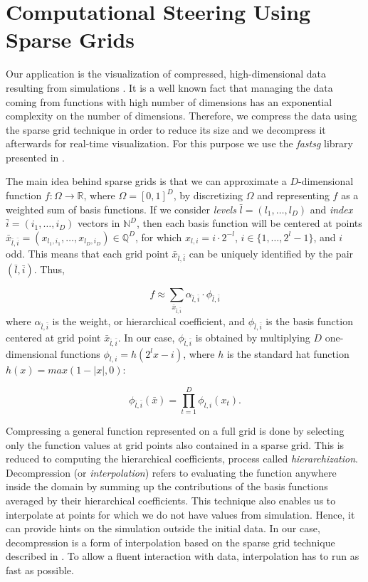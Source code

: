 \section{Computational Steering Using Sparse Grids}
\label{sec:comp_steering}

Our application is the visualization of compressed, high-dimensional data
resulting from simulations \cite{Butnaru201156}. It is a well known fact that
managing the data coming from functions with high number of dimensions has an
exponential complexity on the number of dimensions. Therefore, we compress the
data using the sparse grid technique in order to reduce its size and we
decompress it afterwards for real-time visualization. For this purpose we use
the \textit{fastsg} library presented in \cite{murarasu12fastsg:}.

The main idea behind sparse grids is that we can approximate a $D$-dimensional
function $f : \Omega \rightarrow \mathbb{R}$, where $\Omega = [0, 1]^{D}$, by
discretizing $\Omega$ and representing $f$ as a weighted sum of basis functions.
If we consider \textit{levels} $\bar{l} = (l_{1},\ldots,l_{D})$ and
\textit{index} $\bar{i} = (i_{1},\ldots,i_{D})$ vectors in $\mathbb{N}^{D}$,
then each basis function will be centered at points $\bar{x}_{\bar{l},\bar{i}} =
(x_{l_{1},i_{1}},\ldots,x_{l_{D},i_{D}}) \in \mathbb{Q}^{D}$, for which $x_{l,i}
= i \cdot 2^{-l}$, $i \in \{1,\ldots,2^{l} - 1\}$, and $i$ odd. This means that
each grid point $\bar{x}_{\bar{l},\bar{i}}$ can be uniquely identified by the
pair $(\bar{l},\bar{i})$. Thus,

\[ f \approx \sum_{\bar{x}_{\bar{l},\bar{i}}} \alpha_{\bar{l},\bar{i}} \cdot
\phi_{\bar{l},\bar{i}} \]
where $\alpha_{\bar{l},\bar{i}}$ is the weight, or hierarchical coefficient, and
$\phi_{\bar{l},\bar{i}}$ is the basis function centered at grid point
$\bar{x}_{\bar{l},\bar{i}}$. In our case, $\phi_{\bar{l},\bar{i}}$ is obtained
by multiplying $D$ one-dimensional functions $\phi_{l,i} = h(2^{l}x - i)$, where
$h$ is the standard hat function $h(x) = max(1 - |x|, 0)$:

\[ \phi_{\bar{l},\bar{i}}(\bar{x}) = \prod_{t=1}^{D} \phi_{l,i}(x_{t}) .\]

Compressing a general function represented on a full grid is done by selecting
only the function values at grid points also contained in a sparse grid. This is
reduced to computing the hierarchical coefficients, process called
\textit{hierarchization}. Decompression (or \textit{interpolation}) refers to
evaluating the function anywhere inside the domain by summing up the
contributions of the basis functions averaged by their hierarchical
coefficients. This technique also enables us to interpolate at points for which
we do not have values from simulation. Hence, it can provide hints on the
simulation outside the initial data. In our case, decompression is a form of
interpolation based on the sparse grid technique described in
\cite{CambridgeJournals:227245}. To allow a fluent interaction with data,
interpolation has to run as fast as possible.

